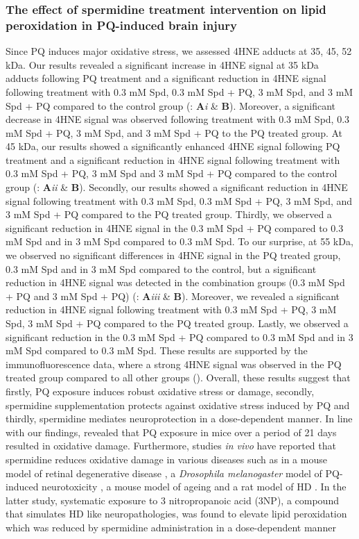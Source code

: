 \subsubsection{The effect of spermidine treatment intervention on lipid peroxidation in PQ-induced brain injury}
Since PQ induces major oxidative stress, we assessed 4HNE adducts at 35, 45, 52 kDa. Our results revealed a significant increase in 4HNE signal at 35 kDa adducts following PQ treatment and a significant reduction in 4HNE signal following treatment with 0.3 mM Spd, 0.3 mM Spd + PQ, 3 mM Spd, and 3 mM Spd + PQ compared to the control group (: \textbf{A}\textit{i} \& \textbf{B}). Moreover, a significant decrease in 4HNE signal was observed following treatment with 0.3 mM Spd, 0.3 mM Spd + PQ, 3 mM Spd, and 3 mM Spd + PQ to the PQ treated group. At 45 kDa, our results showed a significantly enhanced 4HNE signal following PQ treatment and a significant reduction in 4HNE signal following treatment with 0.3 mM Spd + PQ, 3 mM Spd and 3 mM Spd + PQ compared to the control group (: \textbf{A}\textit{ii} \& \textbf{B}). Secondly, our results showed a significant reduction in 4HNE signal following treatment with 0.3 mM Spd, 0.3 mM Spd + PQ, 3 mM Spd, and 3 mM Spd + PQ compared to the PQ treated group. Thirdly, we observed a significant reduction in 4HNE signal in the 0.3 mM Spd + PQ compared to 0.3 mM Spd and in 3 mM Spd compared to 0.3 mM Spd. To our surprise, at 55 kDa, we observed no significant differences in 4HNE signal in the PQ treated group, 0.3 mM Spd and in 3 mM Spd compared to the control, but  a significant reduction in 4HNE signal was detected in the combination groups (0.3 mM Spd + PQ and 3 mM Spd + PQ) (: \textbf{A}\textit{iii} \& \textbf{B}). Moreover, we revealed a significant reduction in 4HNE signal following treatment with 0.3 mM Spd + PQ, 3 mM Spd, 3 mM Spd + PQ compared to the PQ treated group. Lastly, we observed a significant reduction in the 0.3 mM Spd + PQ compared to 0.3 mM Spd and in 3 mM Spd compared to 0.3 mM Spd. These results are supported by the immunofluorescence data, where a strong 4HNE signal was observed in the PQ treated group compared to all other groups (). Overall, these results suggest that firstly, PQ exposure induces robust oxidative stress or damage, secondly, spermidine supplementation protects against oxidative stress induced by PQ and thirdly, spermidine mediates neuroprotection in a dose-dependent manner. In line with our findings, \citet{Chen2012} revealed that PQ exposure in mice over a period of 21 days resulted in oxidative damage. Furthermore, studies \textit{in vivo} have reported that spermidine reduces oxidative damage in various diseases such as in a mouse model of retinal degenerative disease \citep{Noro2015}, a \textit{Drosophila melanogaster} model of PQ-induced neurotoxicity \citep{Minois2012}, a mouse model of ageing \citep{Eisenberg2009} and a rat model of HD \citep{Jamwal2016}. In the latter study, systematic exposure to 3 nitropropanoic acid (3NP), a compound that simulates HD like neuropathologies, was found to elevate lipid peroxidation which was reduced by spermidine administration in a dose-dependent manner 